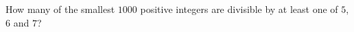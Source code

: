 How many of the smallest $1000$ positive integers are divisible by at least one of $5$, $6$ and $7$?
